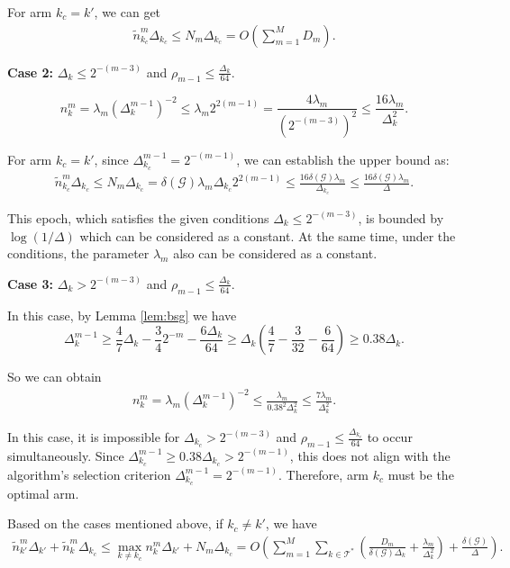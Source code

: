 For arm $k_c = k'$, we can get
\begin{align*}
    \widetilde{n}_{k_c}^m \Delta_{k_c} \leq N_m\Delta_{k_c} = O(\sum_{m=1}^M D_m).
\end{align*}

\textbf{Case 2:} $\Delta_k \leq 2^{-(m-3)}$ and $\rho_{m-1} \leq \frac{\Delta_k}{64}.$

\[n_k^m = \lambda_m(\Delta_k^{m-1})^{-2} \leq \lambda_m 2^{2(m-1)} = \frac{4 \lambda_m}{(2^{-(m-3)})^2} \leq \frac{16 \lambda_m}{\Delta_k^2}.\]

For arm $k_c = k'$, since $\Delta_{k_c}^{m-1} = 2^{-(m-1)}$, we can establish the upper bound as:
\begin{align*}
    \widetilde{n}_{k_c}^m \Delta_{k_c} \leq 
    N_m\Delta_{k_c} = \delta(\mathcal{G}) \lambda_m \Delta_{k_c}2^{2(m-1)} \leq \frac{16\delta(\mathcal{G})\lambda_m}{\Delta_{k_c}} \leq \frac{16\delta(\mathcal{G})\lambda_m}{\Delta}.
\end{align*}

This epoch, which satisfies the given conditions $\Delta_k \leq 2^{-(m-3)}$, is bounded by $\log(1 / \Delta)$ which can be considered as a constant. At the same time, under the conditions, the parameter $\lambda_m$ also can be considered as a constant.

\textbf{Case 3:} $\Delta_k > 2^{-(m-3)}$ and $\rho_{m-1} \leq \frac{\Delta_k}{64}$.

In this case, by Lemma \ref{lem:bsg} we have
\[\Delta_k^{m-1} \geq \frac{4}{7}\Delta_k - \frac{3}{4}2^{-m} - \frac{6\Delta_k}{64} \geq \Delta_k(\frac{4}{7} - \frac{3}{32} - \frac{6}{64}) \geq 0.38 \Delta_k.\]

So we can obtain
\begin{align*}
    n_k^m = \lambda_m(\Delta_k^{m-1})^{-2}
    \leq \frac{\lambda_m}{0.38^2 \Delta_k^2} 
    \leq \frac{7\lambda_m}{\Delta_k^2}.
\end{align*}

In this case, it is impossible for $\Delta_{k_c} > 2^{-(m-3)}$ and $\rho_{m-1} \leq \frac{\Delta_{k_c}}{64}$ to occur simultaneously. Since $\Delta_{k_c}^{m-1} \geq 0.38 \Delta_{k_c} > 2^{-(m-1)}$, this does not align with the algorithm's selection criterion $\Delta_{k_c}^{m-1} = 2^{-(m-1)}$. Therefore, arm $k_c$ must be the optimal arm.

Based on the cases mentioned above, if $k_c \neq k'$, we have
\begin{align*}
    \widetilde{n}_{k'}^m \Delta_{k'} + \widetilde{n}_k^m \Delta_{k_c} 
    \leq \max_{k \neq k_c} n_k^m \Delta_{k'} + N_m \Delta_{k_c} 
    = O\left(\sum_{m=1}^M \sum_{k \in \mathcal{T}^*} \left(\frac{D_m}{\delta(\mathcal{G})\Delta_k} + \frac{\lambda_m}{\Delta_k^2}\right) + \frac{\delta(\mathcal{G})}{\Delta}\right).
\end{align*}

